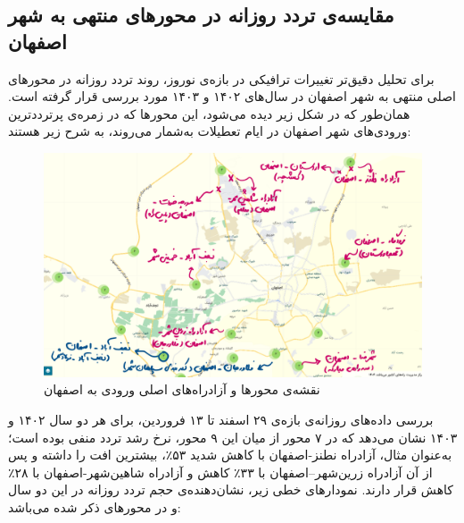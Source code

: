 \documentclass[a4paper, 12pt]{article}
\begin{document}
\subsection{مقایسه‌ی تردد روزانه در محورهای منتهی به شهر اصفهان}
برای تحلیل دقیق‌تر تغییرات ترافیکی در بازه‌ی نوروز، روند تردد روزانه در محورهای اصلی منتهی به شهر اصفهان در سال‌های ۱۴۰۲ و ۱۴۰۳ مورد بررسی قرار گرفته است. همان‌طور که در شکل زیر دیده می‌شود، این محورها که در زمره‌ی پرترددترین ورودی‌های شهر اصفهان در ایام تعطیلات به‌شمار می‌روند، به شرح زیر هستند:
\begin{figure}[htbp]
    \centering
    \includegraphics[width=1\textwidth]{isfahan_141.png}
    \caption{نقشه‌ی محورها و آزادراه‌های اصلی ورودی به اصفهان}
\end{figure}


\newpage
بررسی داده‌های روزانه‌ی بازه‌ی ۲۹ اسفند تا ۱۳ فروردین، برای هر دو سال ۱۴۰۲ و ۱۴۰۳ نشان می‌دهد که در ۷ محور از میان این ۹ محور، نرخ رشد تردد منفی بوده است؛ به‌عنوان مثال، آزادراه نطنز-اصفهان با کاهش شدید ۵۳٪، بیشترین افت را داشته و پس از آن آزادراه زرین‌شهر–اصفهان با ۳۳٪ کاهش و آزادراه شاهین‌شهر-اصفهان با ۲۸٪ کاهش قرار دارند. نمودارهای خطی زیر، نشان‌دهنده‌ی حجم تردد روزانه در این دو سال و در محورهای ذکر شده می‌باشد:
\end{document}
